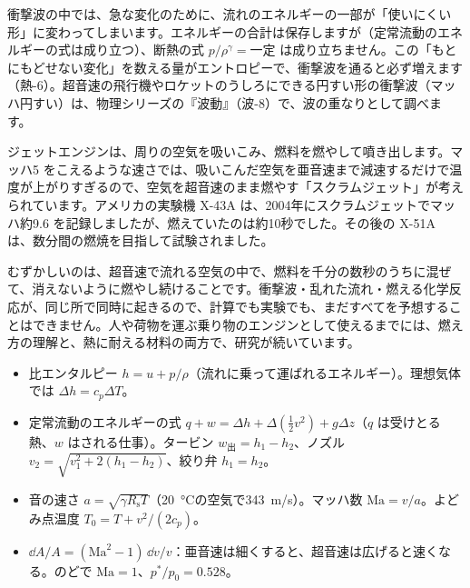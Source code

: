 衝撃波の中では、急な変化のために、流れのエネルギーの一部が「使いにくい形」に変わってしまいます。エネルギーの合計は保存しますが（定常流動のエネルギーの式は成り立つ）、断熱の式 $p/\rho^\gamma=$一定 は成り立ちません。この「もとにもどせない変化」を数える量がエントロピーで、衝撃波を通ると必ず増えます（熱-6）。超音速の飛行機やロケットのうしろにできる円すい形の衝撃波（マッハ円すい）は、物理シリーズの『波動』（波-8）で、波の重なりとして調べます。

\begin{phmada}
ジェットエンジンは、周りの空気を吸いこみ、燃料を燃やして噴き出します。マッハ5 をこえるような速さでは、吸いこんだ空気を亜音速まで減速するだけで温度が上がりすぎるので、空気を超音速のまま燃やす「スクラムジェット」が考えられています。アメリカの実験機 X-43A は、2004年にスクラムジェットでマッハ約9.6 を記録しましたが、燃えていたのは約10秒でした。その後の X-51A は、数分間の燃焼を目指して試験されました。

むずかしいのは、超音速で流れる空気の中で、燃料を千分の数秒のうちに混ぜて、消えないように燃やし続けることです。衝撃波・乱れた流れ・燃える化学反応が、同じ所で同時に起きるので、計算でも実験でも、まだすべてを予想することはできません。人や荷物を運ぶ乗り物のエンジンとして使えるまでには、燃え方の理解と、熱に耐える材料の両方で、研究が続いています。
\end{phmada}

\begin{taisetsu}
\begin{itemize}[leftmargin=1.2\zw, itemsep=2pt, topsep=0pt, label={\color{bkNavy}●}]
\item 比エンタルピー $h=u+p/\rho$（流れに乗って運ばれるエネルギー）。理想気体では $\Delta h=c_p\Delta T$。
\item 定常流動のエネルギーの式 $q+w=\Delta h+\Delta(\tfrac12v^2)+g\Delta z$（$q$ は受けとる熱、$w$ はされる仕事）。タービン $w_{\text{出}}=h_1-h_2$、ノズル $v_2=\sqrt{v_1^2+2(h_1-h_2)}$、絞り弁 $h_1=h_2$。
\item 音の速さ $a=\sqrt{\gamma R_{\mathrm s}T}$（\qty{20}{\celsius}の空気で\qty{343}{m/s}）。マッハ数 $\mathrm{Ma}=v/a$。よどみ点温度 $T_0=T+v^2/(2c_p)$。
\item $\dd A/A=(\mathrm{Ma}^2-1)\,\dd v/v$：亜音速は細くすると、超音速は広げると速くなる。のどで $\mathrm{Ma}=1$、$p^*/p_0=0.528$。
\end{itemize}
\end{taisetsu}

